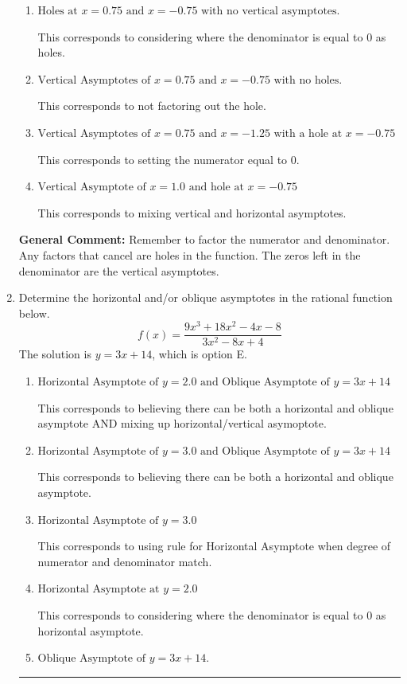 \documentclass{extbook}[14pt]
\newcommand{\litem}[1]{\item #1

\rule{\textwidth}{0.4pt}}
\begin{document}
\begin{enumerate}
{\begin{enumerate}[label=\Alph*.]
This is the correct answer.
\item \( \text{Holes at } x = 0.75 \text{ and } x = -0.75 \text{ with no vertical asymptotes.} \)

This corresponds to considering where the denominator is equal to 0 as holes.
\item \( \text{Vertical Asymptotes of } x = 0.75 \text{ and } x = -0.75 \text{ with no holes.} \)

This corresponds to not factoring out the hole.
\item \( \text{Vertical Asymptotes of } x = 0.75 \text{ and } x = -1.25 \text{ with a hole at } x = -0.75 \)

This corresponds to setting the numerator equal to 0.
\item \( \text{Vertical Asymptote of } x = 1.0 \text{ and hole at } x = -0.75 \)

This corresponds to mixing vertical and horizontal asymptotes.
\end{enumerate}

\textbf{General Comment:} Remember to factor the numerator and denominator. Any factors that cancel are holes in the function. The zeros left in the denominator are the vertical asymptotes.
}
\litem{
Determine the horizontal and/or oblique asymptotes in the rational function below.
\[ f(x) = \frac{9x^{3} +18 x^{2} -4 x -8}{3x^{2} -8 x + 4} \]The solution is \( y = 3x + 14 \), which is option E.\begin{enumerate}[label=\Alph*.]
\item \( \text{Horizontal Asymptote of } y = 2.0 \text{ and Oblique Asymptote of } y = 3x + 14 \)

This corresponds to believing there can be both a horizontal and oblique asymptote AND mixing up horizontal/vertical asymoptote.
\item \( \text{Horizontal Asymptote of } y = 3.0 \text{ and Oblique Asymptote of } y = 3x + 14 \)

This corresponds to believing there can be both a horizontal and oblique asymptote.
\item \( \text{Horizontal Asymptote of } y = 3.0  \)

This corresponds to using rule for Horizontal Asymptote when degree of numerator and denominator match.
\item \( \text{Horizontal Asymptote at } y = 2.0 \)

This corresponds to considering where the denominator is equal to 0 as horizontal asymptote.
\item \( \text{Oblique Asymptote of } y = 3x + 14. \)


\end{enumerate}}
\end{enumerate}
\end{document}
